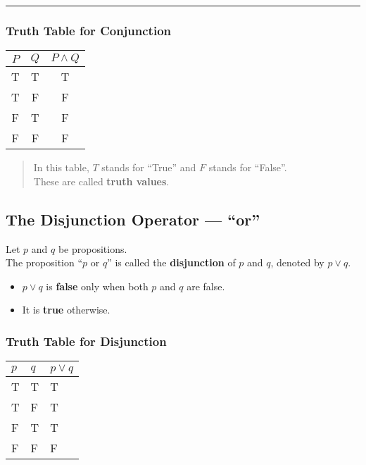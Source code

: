 \documentclass[
]{book}
\providecommand{\tightlist}{%
  \setlength{\itemsep}{0pt}\setlength{\parskip}{0pt}}
\theoremstyle{definition}
\theoremstyle{definition}
\theoremstyle{definition}
\theoremstyle{definition}
\theoremstyle{remark}
\begin{document}
\begin{center}\rule{0.5\linewidth}{0.5pt}\end{center}

\subsubsection{Truth Table for Conjunction}\label{truth-table-for-conjunction}

\begin{longtable}[]{@{}ccc@{}}
\toprule\noalign{}
\(P\) & \(Q\) & \(P \land Q\) \\
\midrule\noalign{}
\endhead
\bottomrule\noalign{}
\endlastfoot
T & T & T \\
T & F & F \\
F & T & F \\
F & F & F \\
\end{longtable}

\begin{quote}
In this table, \(T\) stands for ``True'' and \(F\) stands for ``False''.\\
These are called \textbf{truth values}.
\end{quote}

\subsection{The Disjunction Operator --- ``or''}\label{the-disjunction-operator-or}

Let \(p\) and \(q\) be propositions.\\
The proposition ``\(p\) or \(q\)'' is called the \textbf{disjunction} of \(p\) and \(q\), denoted by \(p \lor q\).

\begin{itemize}
\tightlist
\item
  \(p \lor q\) is \textbf{false} only when both \(p\) and \(q\) are false.
\item
  It is \textbf{true} otherwise.
\end{itemize}

\subsubsection{Truth Table for Disjunction}\label{truth-table-for-disjunction}

\begin{longtable}[]{@{}lll@{}}
\toprule\noalign{}
\(p\) & \(q\) & \(p \lor q\) \\
\midrule\noalign{}
\endhead
\bottomrule\noalign{}
\endlastfoot
T & T & T \\
T & F & T \\
F & T & T \\
F & F & F \\
\end{longtable}
\end{document}
